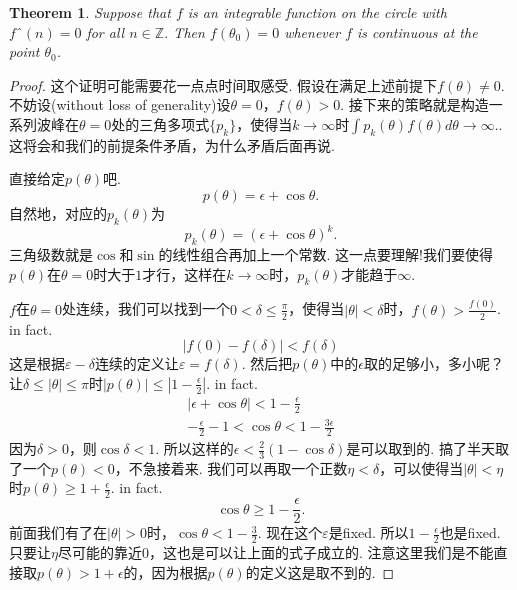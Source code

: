 \documentclass{article}
\newtheorem{theorem}{Theorem}[section]
\begin{document}
\begin{theorem}
Suppose that $f$ is an integrable function on the circle with
$fˆ(n)=0$ for all $n \in \mathbb{Z}$. Then $f(θ_0)= 0$ whenever $f$ is continuous at the point $θ_0$.
\end{theorem}

\begin{proof}
这个证明可能需要花一点点时间取感受. 假设在满足上述前提下$f(\theta) \neq 0$. 不妨设(without loss of generality)设$\theta = 0$，$f(\theta) > 0$. 接下来的策略就是构造一系列波峰在$\theta=0$处的三角多项式$\{p_k\}$，使得当$k \rightarrow \infty$时$\int p_k(\theta)f(\theta)d\theta \rightarrow \infty.$. 这将会和我们的前提条件矛盾，为什么矛盾后面再说.

直接给定$p(\theta)$吧.
$$
	p(\theta) = \epsilon + \cos \theta.
$$
自然地，对应的$p_k(\theta)$为
$$
	p_k(\theta) = (\epsilon + \cos \theta)^k.
$$
三角级数就是$\cos$和$\sin$的线性组合再加上一个常数. 这一点要理解!我们要使得$p(\theta)$在$\theta=0$时大于$1$才行，这样在$k \rightarrow \infty$时，$p_k(\theta)$才能趋于$\infty$.

$f$在$\theta=0$处连续，我们可以找到一个$0 < \delta \leq \frac{\pi}{2}$，使得当$|\theta| < \delta$时，$f(\theta) > \frac{f(0)}{2}$. in fact.
$$
  |f(0)-f(\delta)| < f(\delta) 
$$
这是根据$\varepsilon-\delta$连续的定义让$\varepsilon = f(\delta)$. 然后把$p(\theta)$中的$\epsilon$取的足够小，多小呢？让$\delta \leq |\theta| \leq \pi$时$|p(\theta)| \leq |1-\frac{\epsilon}{2}|$. in fact.
$$
\begin{aligned}
|\epsilon + \cos \theta| < 1-\frac{\epsilon}{2} \\
-\frac{\epsilon}{2} - 1<\cos \theta < 1 - \frac{3\epsilon}{2}
\end{aligned}
$$
因为$\delta > 0$，则$\cos \delta < 1$. 所以这样的$\epsilon <\frac23 (1-\cos \delta)$是可以取到的. 搞了半天取了一个$p(\theta)<0$，不急接着来. 我们可以再取一个正数$\eta < \delta$，可以使得当$|\theta| < \eta$时$p(\theta) \geq 1 + \frac{\epsilon}{2}$. in fact.
$$
\cos \theta \geq 1 - \frac{\epsilon}{2}.
$$
前面我们有了在$|\theta| > 0$时，$\cos \theta < 1 - \frac{3}{2}$. 现在这个$\varepsilon$是fixed. 所以$1-\frac{\epsilon}{2}$也是fixed. 只要让$\eta$尽可能的靠近$0$，这也是可以让上面的式子成立的. 注意这里我们是不能直接取$p(\theta) > 1 + \epsilon$的，因为根据$p(\theta)$的定义这是取不到的.


\end{proof}
\end{document}
